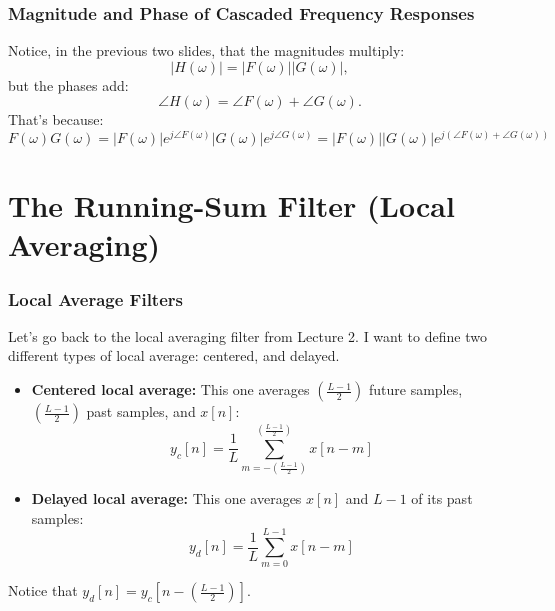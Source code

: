 \documentclass{beamer}
\begin{document}
\begin{frame}
  \frametitle{Magnitude and Phase of Cascaded Frequency Responses}

  Notice, in the previous two slides, that the magnitudes multiply:
  \[
  |H(\omega)|=|F(\omega)||G(\omega)|,
  \]
  but the phases add:
  \[
  \angle H(\omega) = \angle F(\omega)+\angle G(\omega).
  \]
  That's because:
  \[
  F(\omega)G(\omega)=|F(\omega)|e^{j\angle F(\omega)}|G(\omega)|e^{j\angle G(\omega)}
  =|F(\omega)||G(\omega)| e^{j\left(\angle F(\omega)+\angle G(\omega)\right)}
  \]
\end{frame}

\section[Sum]{The Running-Sum Filter (Local Averaging)}
\setcounter{subsection}{1}

\begin{frame}
  \frametitle{Local Average Filters}

  Let's go back to the local averaging filter from Lecture 2. I want to define two 
  different types of local average: centered, and delayed.
  \begin{itemize}
  \item {\bf Centered local average:} This one averages
    $\left(\frac{L-1}{2}\right)$ future samples,
    $\left(\frac{L-1}{2}\right)$ past samples, and $x[n]$:
    \[
    y_c[n] = \frac{1}{L}\sum_{m=-\left(\frac{L-1}{2}\right)}^{\left(\frac{L-1}{2}\right)} x[n-m]
    \]
  \item {\bf Delayed local average:} This one averages $x[n]$ and $L-1$ of its
    past samples:
    \[
    y_d[n] = \frac{1}{L}\sum_{m=0}^{L-1} x[n-m]
    \]
  \end{itemize}
  Notice that $y_d[n] = y_c\left[n-\left(\frac{L-1}{2}\right)\right]$.
\end{frame}
\end{document}
